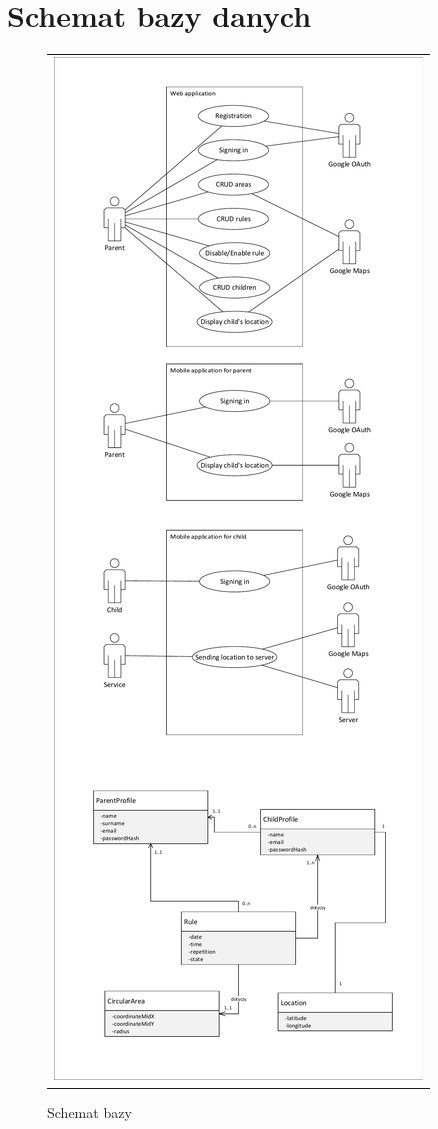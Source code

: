 \documentclass{sprawozdanie-agh}
\begin{document}
	\section{Schemat bazy danych}
	\begin{figure}[H] 
		\centering
		\begin{tabular}{c}
			\includegraphics[width=.95\textwidth]{baza} 
		\end{tabular} 
		\caption{Schemat bazy}
	\end{figure}
\end{document}
